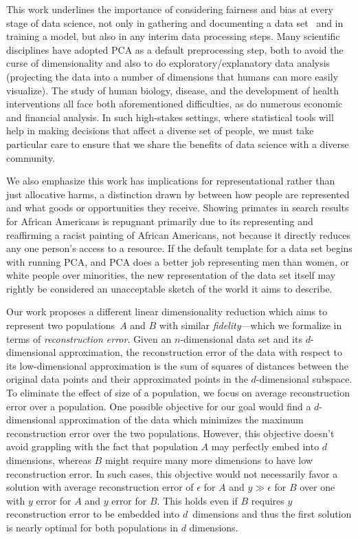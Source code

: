 \documentclass{article}
\begin{document}
This work underlines the importance of considering fairness and bias
at every stage of data science, not only in gathering and documenting
a data set~\citep{datasheets} and in training a model, but also in any
interim data processing steps. Many scientific disciplines have
adopted PCA as a default preprocessing step, both to avoid the curse
of dimensionality and also to do exploratory/explanatory data analysis
(projecting the data into a number of dimensions that humans can more
easily visualize). The study of human biology, disease, and the
development of health interventions all face both aforementioned
difficulties, as do numerous economic and financial analysis. In such
high-stakes settings, where statistical tools will help in making
decisions that affect a diverse set of people, we must take particular
care to ensure that we share the benefits of data science with a
diverse community.


We also emphasize this work has implications for representational
rather than just allocative harms, a distinction drawn by 
\citet{kate17} between how people are represented and what
goods or opportunities they receive. Showing primates in search
results for African Americans is repugnant primarily due to its
representing and reaffirming a racist painting of African Americans,
not because it directly reduces any one person's access to a
resource. If the default template for a data set begins with running
PCA, and PCA does a better job representing men than women, or white
people over minorities, the new representation of the data set itself
may rightly be considered an unacceptable sketch of the world it aims
to describe.


Our work proposes a different linear dimensionality reduction
which aims to represent two populations~$A$ and $B$ with similar
{\it fidelity}---which we formalize in terms of {\it reconstruction error}. Given an $n$-dimensional data set and its $d$-dimensional approximation, the reconstruction error of the data 
with respect to its low-dimensional approximation is the sum of squares of distances between the original data points and their approximated points in the $d$-dimensional subspace. To eliminate the effect of size of a population, we focus on  average reconstruction error over a population.  
One possible objective for our goal  
would find a $d$-dimensional approximation of the data
which minimizes the
maximum reconstruction error over the two populations. However, this
objective doesn't avoid grappling with the fact that population $A$
may perfectly embed into $d$ dimensions, whereas $B$ might require
many more dimensions to have low reconstruction error. 
In such cases, this objective would not necessarily favor a solution with average
reconstruction error of $\epsilon$ for $A$ and $y\gg\epsilon$ for $B$ over one with
$y$ error for $A$ and $y$ error for $B$. This holds even
if $B$ requires $y$ reconstruction error to be embedded into $d$~dimensions and thus the first solution is nearly optimal for both populations
in $d$ dimensions. 
\end{document}
